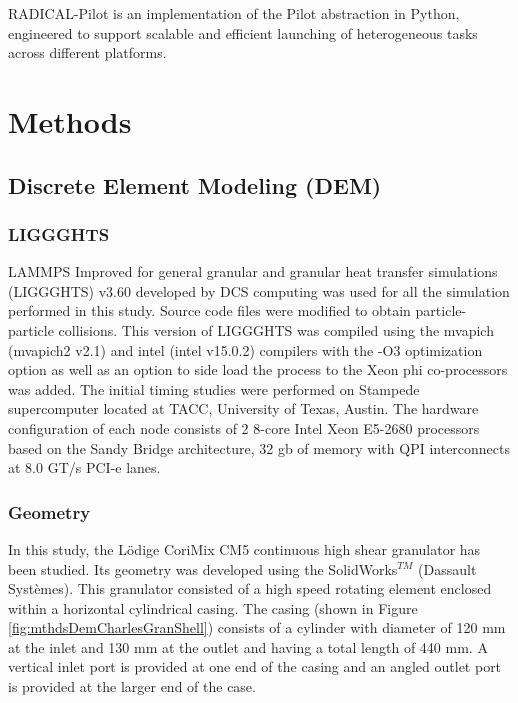 \documentclass[preprint,11pt,authoryear]{elsarticle}
\begin{document}
RADICAL-Pilot is an implementation of the Pilot abstraction in Python, engineered to
support scalable and efficient launching of heterogeneous tasks across different platforms.
\section{Methods}

\subsection{Discrete Element Modeling (DEM)}
\subsubsection{LIGGGHTS}
LAMMPS Improved for general granular and granular heat transfer simulations (LIGGGHTS) v3.60 
developed by DCS computing was used for all the simulation performed in this study. 
Source code files were modified to obtain particle-particle 
collisions. This version of LIGGGHTS was compiled using the mvapich (mvapich2 v2.1) 
and intel (intel v15.0.2) compilers with the -O3 optimization option as well as an option to side load the 
process to the Xeon phi co-processors was added. The initial timing studies were performed on Stampede 
supercomputer located at TACC, University of Texas, Austin. The hardware configuration of each node 
consists of 2 8-core Intel Xeon E5-2680 processors based on the Sandy Bridge architecture, 32 gb of 
memory with QPI interconnects at 8.0 GT/s PCI-e lanes.


\subsubsection{Geometry}    
 In this study, the L\"{o}dige CoriMix CM5 continuous high shear granulator has been studied. Its 
geometry was developed using the SolidWorks$^{TM}$ (Dassault Syst\`{e}mes). This granulator 
consisted of a high speed rotating element enclosed within a horizontal cylindrical casing. The casing 
(shown in Figure \ref{fig:mthdsDemCharlesGranShell}) consists of a cylinder with diameter of 120 mm 
at the inlet and 130 mm at the outlet and having a total length of 440 mm. A vertical inlet port is 
provided at one end of the casing and an angled outlet port is provided at the larger end of the case. 
\end{document}
